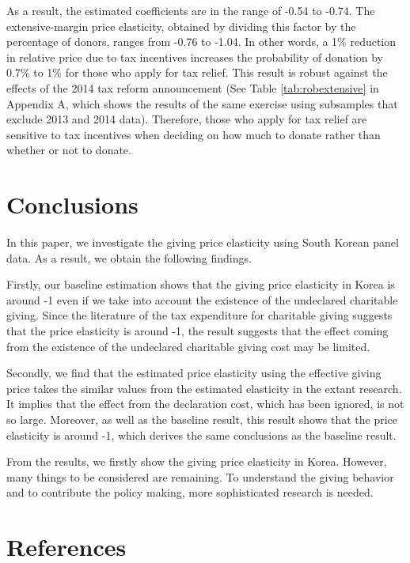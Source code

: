 \documentclass[
  11pt,
  a4paper,
]{article}
\begin{document}
As a result, the estimated coefficients are in the range of -0.54 to -0.74.
The extensive-margin price elasticity,
obtained by dividing this factor by the percentage of donors,
ranges from -0.76 to -1.04.
In other words,
a 1\% reduction in relative price due to tax incentives increases
the probability of donation by 0.7\% to 1\%
for those who apply for tax relief.
This result is robust against
the effects of the 2014 tax reform announcement
(See Table \ref{tab:robextensive} in Appendix A,
which shows the results of the same exercise
using subsamples that exclude 2013 and 2014 data).
Therefore,
those who apply for tax relief are sensitive to tax incentives
when deciding on how much to donate rather than whether or not to donate.

\hypertarget{conclusions}{%
\section{Conclusions}\label{conclusions}}

In this paper, we investigate the giving price elasticity using South Korean panel data. As a result, we obtain the following findings.

Firstly, our baseline estimation shows that the giving price elasticity in Korea is around -1 even if we take into account the existence of the undeclared charitable giving. Since the literature of the tax expenditure for charitable giving suggests that the price elasticity is around -1, the result suggests that the effect coming from the existence of the undeclared charitable giving cost may be limited.

Secondly, we find that the estimated price elasticity using the effective giving price takes the similar values from the estimated elasticity in the extant research. It implies that the effect from the declaration cost, which has been ignored, is not so large. Moreover, as well as the baseline result, this result shows that the price elasticity is around -1, which derives the same conclusions as the baseline result.

From the results, we firstly show the giving price elasticity in Korea. However, many things to be considered are remaining. To understand the giving behavior and to contribute the policy making, more sophisticated research is needed.

\newpage

\hypertarget{references}{%
\section*{References}\label{references}}
\end{document}

